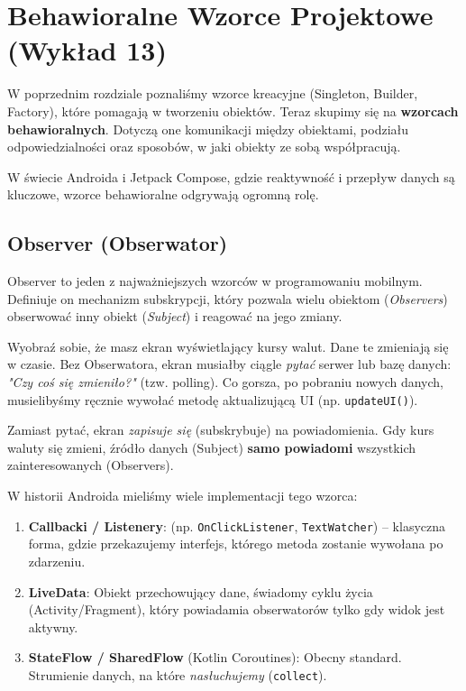\chapter{Behawioralne Wzorce Projektowe (Wykład 13)}

W poprzednim rozdziale poznaliśmy wzorce kreacyjne (Singleton, Builder, Factory), które pomagają w tworzeniu obiektów. Teraz skupimy się na \textbf{wzorcach behawioralnych}. Dotyczą one komunikacji między obiektami, podziału odpowiedzialności oraz sposobów, w jaki obiekty ze sobą współpracują.

W świecie Androida i Jetpack Compose, gdzie reaktywność i przepływ danych są kluczowe, wzorce behawioralne odgrywają ogromną rolę.

\section{Observer (Obserwator)}

Observer to jeden z najważniejszych wzorców w programowaniu mobilnym. Definiuje on mechanizm subskrypcji, który pozwala wielu obiektom (\textit{Observers}) obserwować inny obiekt (\textit{Subject}) i reagować na jego zmiany.

Wyobraź sobie, że masz ekran wyświetlający kursy walut. Dane te zmieniają się w czasie. Bez Obserwatora, ekran musiałby ciągle \textit{pytać} serwer lub bazę danych: \textit{"Czy coś się zmieniło?"} (tzw. polling). Co gorsza, po pobraniu nowych danych, musielibyśmy ręcznie wywołać metodę aktualizującą UI (np. \texttt{updateUI()}).

Zamiast pytać, ekran \textit{zapisuje się} (subskrybuje) na powiadomienia. Gdy kurs waluty się zmieni, źródło danych (Subject) \textbf{samo powiadomi} wszystkich zainteresowanych (Observers).

W historii Androida mieliśmy wiele implementacji tego wzorca:
\begin{enumerate}
    \item \textbf{Callbacki / Listenery}: (np. \texttt{OnClickListener}, \texttt{TextWatcher}) – klasyczna forma, gdzie przekazujemy interfejs, którego metoda zostanie wywołana po zdarzeniu.
    \item \textbf{LiveData}: Obiekt przechowujący dane, świadomy cyklu życia (Activity/Fragment), który powiadamia obserwatorów tylko gdy widok jest aktywny.
    \item \textbf{StateFlow / SharedFlow} (Kotlin Coroutines): Obecny standard. Strumienie danych, na które \textit{nasłuchujemy} (\texttt{collect}).
\end{enumerate}



